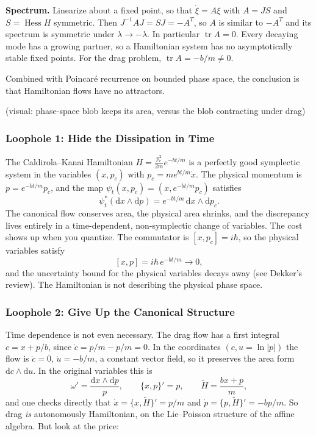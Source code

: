 \textbf{Spectrum.} Linearize about a fixed point, so that $\dot\xi = A\xi$ with $A = J S$ and $S = \operatorname{Hess}H$ symmetric. Then $J^{-1} A J = SJ = -A^{T}$, so $A$ is similar to $-A^T$ and its spectrum is symmetric under $\lambda \to -\lambda$. In particular $\operatorname{tr}A = 0$. Every decaying mode has a growing partner, so a Hamiltonian system has no asymptotically stable fixed points. For the drag problem, $\operatorname{tr}A = -b/m \neq 0$.

Combined with Poincar\'e recurrence on bounded phase space, the conclusion is that Hamiltonian flows have no attractors.

(visual: phase-space blob keeps its area, versus the blob contracting under drag)

\subsubsection{Loophole 1: Hide the Dissipation in Time}

The Caldirola--Kanai Hamiltonian $H = \frac{p_c^2}{2m}e^{-bt/m}$ is a perfectly good symplectic system in the variables $(x, p_c)$ with $p_c = m e^{bt/m}\dot x$. The physical momentum is $p = e^{-bt/m}p_c$, and the map $\psi_t(x,p_c) = (x, e^{-bt/m}p_c)$ satisfies
\[
	\psi_t^*(\mathrm{d}x\wedge \mathrm{d}p) = e^{-bt/m}\,\mathrm{d}x\wedge\mathrm{d}p_c .
\]
The canonical flow conserves area, the physical area shrinks, and the discrepancy lives entirely in a time-dependent, non-symplectic change of variables. The cost shows up when you quantize. The commutator is $[x,p_c] = i\hbar$, so the physical variables satisfy
\[
	[x,p] = i\hbar\, e^{-bt/m} \to 0 ,
\]
and the uncertainty bound for the physical variables decays away (see Dekker's review). The Hamiltonian is not describing the physical phase space.

\subsubsection{Loophole 2: Give Up the Canonical Structure}

Time dependence is not even necessary. The drag flow has a first integral $c = x + p/b$, since $\dot c = p/m - p/m = 0$. In the coordinates $(c, u = \ln|p|)$ the flow is $\dot c = 0$, $\dot u = -b/m$, a constant vector field, so it preserves the area form $\mathrm{d}c\wedge \mathrm{d}u$. In the original variables this is
\[
	\omega' = \frac{\mathrm{d}x\wedge \mathrm{d}p}{p}, \qquad
	\{x,p\}' = p, \qquad
	\tilde H = \frac{bx + p}{m},
\]
and one checks directly that $\dot x = \{x,\tilde H\}' = p/m$ and $\dot p = \{p,\tilde H\}' = -bp/m$. So drag \emph{is} autonomously Hamiltonian, on the Lie--Poisson structure of the affine algebra. But look at the price:

